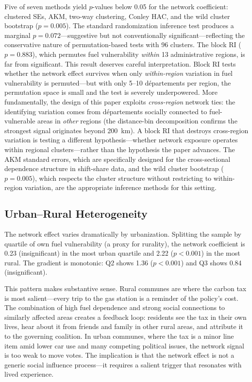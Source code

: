 \documentclass[12pt]{article}
\newcommand{\depts}{d\'{e}partements}
\begin{document}
Five of seven methods yield $p$-values below 0.05 for the network coefficient: clustered SEs, AKM, two-way clustering, Conley HAC, and the wild cluster bootstrap ($p = 0.005$). The standard randomization inference test produces a marginal $p = 0.072$---suggestive but not conventionally significant---reflecting the conservative nature of permutation-based tests with 96 clusters. The block RI ($p = 0.883$), which permutes fuel vulnerability \emph{within} 13 administrative regions, is far from significant. This result deserves careful interpretation. Block RI tests whether the network effect survives when only \emph{within-region} variation in fuel vulnerability is permuted---but with only 5--10 \depts{} per region, the permutation space is small and the test is severely underpowered. More fundamentally, the design of this paper exploits \emph{cross-region} network ties: the identifying variation comes from \depts{} socially connected to fuel-vulnerable areas in \emph{other} regions (the distance-bin decomposition confirms the strongest signal originates beyond 200~km). A block RI that destroys cross-region variation is testing a different hypothesis---whether network exposure operates within regional clusters---rather than the hypothesis the paper advances. The AKM standard errors, which are specifically designed for the cross-sectional dependence structure in shift-share data, and the wild cluster bootstrap ($p = 0.005$), which respects the cluster structure without restricting to within-region variation, are the appropriate inference methods for this setting.

\subsection{Urban--Rural Heterogeneity}

The network effect varies dramatically by urbanization. Splitting the sample by quartile of own fuel vulnerability (a proxy for rurality), the network coefficient is 0.23 (insignificant) in the most urban quartile and 2.22 ($p < 0.001$) in the most rural. The gradient is monotonic: Q2 shows 1.36 ($p < 0.001$) and Q3 shows 0.84 (insignificant).

This pattern makes substantive sense. Rural communes are where the carbon tax is most salient---every trip to the gas station is a reminder of the policy's cost. The combination of high fuel dependence and strong social connections to similarly affected areas creates a feedback loop: residents see the tax in their own lives, hear about it from friends and family in other rural areas, and attribute it to the governing coalition. In urban communes, where the tax is a minor line item amid lower car use and many competing political issues, the network signal is too weak to move votes. The implication is that the network effect is not a generic social influence process---it requires a salient trigger that resonates with lived experience.
\end{document}
